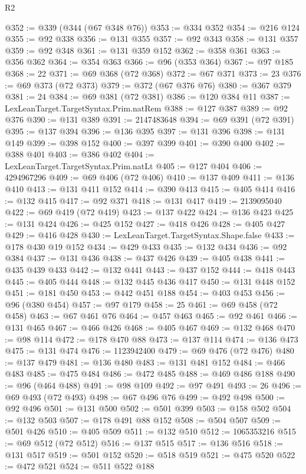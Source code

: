 \begin{lexlean}{R2}
\begin{coremodule}
@352 := @339 (@344 (@67 @348 @76))
@353 := @334 @352
@354 := @216 @124
@355 := @92 @338
@356 := @131 @355
@357 := @92 @343
@358 := @131 @357
@359 := @92 @348
@361 := @131 @359 @152
@362 := @358 @361
@363 := @356 @362
@364 := @354 @363
@366 := @96 (@353 @364)
@367 := @97 @185
@368 := 22
@371 := @69 @368 (@72 @368)
@372 := @67 @371
@373 := 23
@376 := @69 @373 (@72 @373)
@379 := @372 (@67 @376 @76)
@380 := @367 @379
@381 := 24
@384 := @69 @381 (@72 @381)
@386 := @120 @384 @11
@387 := LexLeanTarget.TargetSyntax.Prim.natRem
@388 := @127 @387
@389 := @92 @376
@390 := @131 @389
@391 := 2147483648
@394 := @69 @391 (@72 @391)
@395 := @137 @394
@396 := @136 @395
@397 := @131 @396
@398 := @131 @149
@399 := @398 @152
@400 := @397 @399
@401 := @390 @400
@402 := @388 @401
@403 := @386 @402
@404 := LexLeanTarget.TargetSyntax.Prim.natLt
@405 := @127 @404
@406 := 4294967296
@409 := @69 @406 (@72 @406)
@410 := @137 @409
@411 := @136 @410
@413 := @131 @411 @152
@414 := @390 @413
@415 := @405 @414
@416 := @132 @415
@417 := @92 @371
@418 := @131 @417
@419 := 2139095040
@422 := @69 @419 (@72 @419)
@423 := @137 @422
@424 := @136 @423
@425 := @131 @424
@426 := @425 @152
@427 := @418 @426
@428 := @405 @427
@429 := @416 @428
@430 := LexLeanTarget.TargetSyntax.Shape.false
@433 := @178 @430 @19 @152
@434 := @429 @433
@435 := @132 @434
@436 := @92 @384
@437 := @131 @436
@438 := @437 @426
@439 := @405 @438
@441 := @435 @439 @433
@442 := @132 @441
@443 := @437 @152
@444 := @418 @443
@445 := @405 @444
@448 := @132 @445 @436 @417
@450 := @131 @448 @152
@451 := @181 @450
@453 := @442 @451 @188
@454 := @403 @453
@456 := @96 (@380 @454)
@457 := @97 @179
@458 := 25
@461 := @69 @458 (@72 @458)
@463 := @67 @461 @76
@464 := @457 @463
@465 := @92 @461
@466 := @131 @465
@467 := @466 @426
@468 := @405 @467
@469 := @132 @468
@470 := @98 @114
@472 := @178 @470 @88
@473 := @137 @114
@474 := @136 @473
@475 := @131 @474
@476 := 1123942400
@479 := @69 @476 (@72 @476)
@480 := @137 @479
@481 := @136 @480
@483 := @131 @481 @152
@484 := @466 @483
@485 := @475 @484
@486 := @472 @485
@488 := @469 @486 @188
@490 := @96 (@464 @488)
@491 := @98 @109
@492 := @97 @491
@493 := 26
@496 := @69 @493 (@72 @493)
@498 := @67 @496 @76
@499 := @492 @498
@500 := @92 @496
@501 := @131 @500
@502 := @501 @399
@503 := @158 @502
@504 := @132 @503
@507 := @178 @491 @88 @152
@508 := @504 @507
@509 := @501 @426
@510 := @405 @509
@511 := @132 @510
@512 := 1065353216
@515 := @69 @512 (@72 @512)
@516 := @137 @515
@517 := @136 @516
@518 := @131 @517
@519 := @501 @152
@520 := @518 @519
@521 := @475 @520
@522 := @472 @521
@524 := @511 @522 @188

\end{coremodule}
\end{lexlean}
